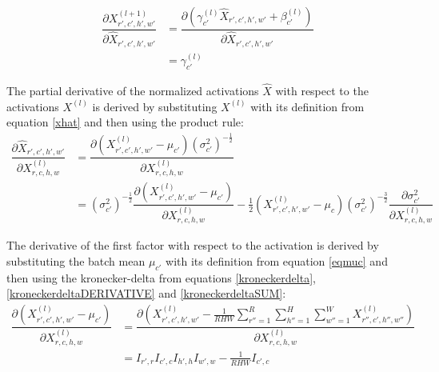 \documentclass[a4paper, twoside]{article}
\newcommand*{\pd}[2]{\ensuremath{\dfrac{\partial #1}{\partial #2}}}
\begin{document}
\begin{equation}\label{BN_dxdxhat}
\begin{split}
	\pd{X^{(l+1)}_{r',c',h',w'}}{\hat{X}_{r',c',h',w'}}
		& = \pd{(\gamma_{c'}^{(l)} \hat{X}_{r',c',h',w'} + \beta_{c'}^{(l)})}{\hat{X}_{r',c',h',w'}} \\
		& =\gamma_{c'}^{(l)}
\end{split}
\end{equation}

The partial derivative of the normalized activations $\hat{X}$ with respect to the activations $X^{(l)}$ is derived by substituting $X^{(l)}$ with its definition from equation \eqref{xhat} and then using the product rule: \cite{webBN1} \cite{webBN2}
\begin{equation}\label{BN_kedjeregeln}
\begin{split}
\pd{\hat{X}_{r',c',h',w'}}{{X}^{(l)}_{r,c,h,w}} 
	& = \pd{(X^{(l)}_{r',c',h',w'} - \mu_{c'}){(\sigma^2_{c'})}^{-\frac{1}{2}}}{{X}^{(l)}_{r,c,h,w}} \\
	& = {(\sigma^2_{c'})}^{-\frac{1}{2}} \pd{(X^{(l)}_{r',c',h',w'} - \mu_{c'})}{{X}^{(l)}_{r,c,h,w}} - \frac{1}{2}(X^{(l)}_{r',c',h',w'} - \mu_c){(\sigma^2_{c'})}^{-\frac{3}{2}} \pd{\sigma^2_{c'}}{{X}^{(l)}_{r,c,h,w}}
\end{split}
\end{equation}

The derivative of the first factor with respect to the activation is derived by substituting the batch mean $\mu_{c'}$ with its definition from equation \eqref{eqmuc} and then using the kronecker-delta from equations \eqref{kroneckerdelta}, \eqref{kroneckerdeltaDERIVATIVE} and \eqref{kroneckerdeltaSUM}: \cite{webBN1} \cite{webBN2}
\begin{equation}\label{mu'}
\begin{split}
\pd{(X^{(l)}_{r',c',h',w'} - \mu_{c'})}{{X}^{(l)}_{r,c,h,w}}
	& = \pd{({X^{(l)}_{r',c',h',w'} - \frac{1}{RHW} \sum\limits^{R }_{r''=1} \sum\limits^{H }_{h''=1} \sum\limits^{W }_{w''=1} X^{(l)}_{r'',c',h'',w''}})}{{X}^{(l)}_{r,c,h,w}} \\
	& = I_{r',r} I_{c',c} I_{h',h} I_{w',w} - \frac{1}{RHW} I_{c',c}
\end{split}
\end{equation}
\end{document}
